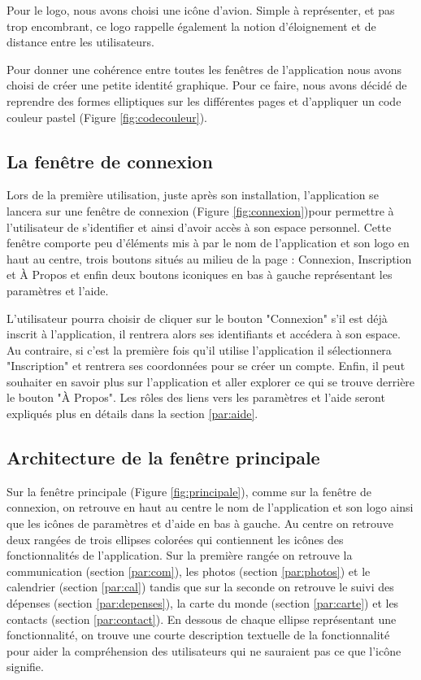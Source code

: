 \documentclass[11pt]{article}
\begin{document}
Pour le logo, nous avons choisi une icône d'avion. Simple à représenter, et pas trop encombrant, ce logo rappelle également la notion d'éloignement et de distance entre les utilisateurs.

Pour donner une cohérence entre toutes les fenêtres de l'application nous avons choisi de créer une petite identité graphique. Pour ce faire, nous avons décidé de reprendre des formes elliptiques  sur les différentes pages et d'appliquer un code couleur pastel (Figure \ref{fig:codecouleur}).
\subsection{La fenêtre de connexion}
Lors de la première utilisation, juste après son installation, l'application se lancera sur une fenêtre de connexion (Figure \ref{fig:connexion})pour permettre à l'utilisateur de s'identifier et ainsi d'avoir accès à son espace personnel. Cette fenêtre comporte peu d'éléments mis à par le nom de l'application et son logo en haut au centre, trois boutons situés au milieu de la page : Connexion, Inscription et À Propos et enfin deux boutons iconiques en bas à gauche représentant les paramètres et l'aide. 

L'utilisateur pourra choisir de cliquer sur le bouton "Connexion" s'il est déjà inscrit à l'application, il rentrera alors ses identifiants et accédera à son espace. Au contraire, si c'est la première fois qu'il utilise l'application il sélectionnera "Inscription" et rentrera ses coordonnées pour se créer un compte. Enfin, il peut souhaiter en savoir plus sur l'application et aller explorer ce qui se trouve derrière le bouton "À Propos".  Les rôles des liens vers les paramètres et l'aide seront expliqués plus en détails dans la section \ref{par:aide}.

\subsection{Architecture de la fenêtre principale}
Sur la fenêtre principale  (Figure \ref{fig:principale}), comme sur la fenêtre de connexion, on retrouve en haut au centre le nom de l'application et son logo ainsi que les icônes de paramètres et d'aide en bas à gauche. Au centre on retrouve deux rangées de trois ellipses colorées qui contiennent les icônes des fonctionnalités de l'application. Sur la première rangée on retrouve la communication (section \ref{par:com}), les photos (section \ref{par:photos}) et le calendrier (section \ref{par:cal}) tandis que sur la seconde on retrouve le suivi des dépenses (section \ref{par:depenses}), la carte du monde (section \ref{par:carte}) et les contacts (section \ref{par:contact}). En dessous de chaque ellipse représentant une fonctionnalité, on trouve une courte description textuelle de la fonctionnalité pour aider la compréhension des utilisateurs qui ne sauraient pas ce que l'icône signifie.
\end{document}
